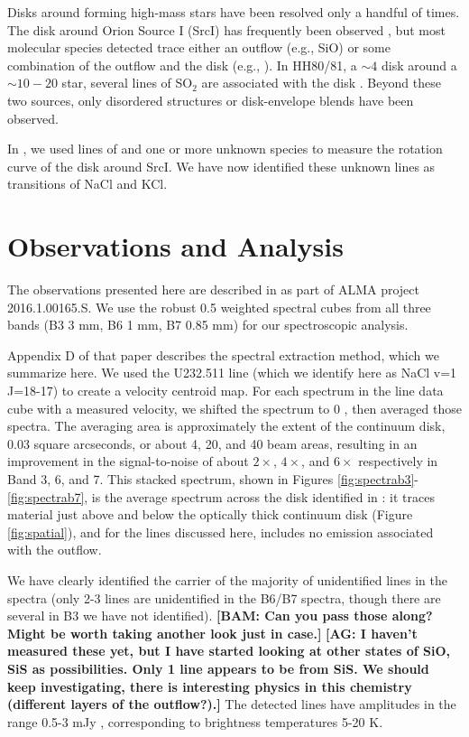 \documentclass[twocolumn]{aastex62}
\newcommand{\sourcei}{SrcI\xspace}
\newcommand{\bam}[1]{\textcolor{green!65!black}{\textbf{[BAM: #1]}}}
\newcommand{\ag}[1]{\textcolor{red!65!black}{\textbf{[AG: #1]}}}
\begin{document}
Disks around forming high-mass stars have been resolved only a handful of
times.  The disk around Orion Source I (\sourcei) has frequently been observed
\citep{Hirota2014a,Plambeck2016a,Ginsburg2018b}, but most molecular species
detected trace either an outflow (e.g., SiO) or some combination of the outflow
and the disk (e.g., \water).  In HH80/81, a $\sim4$ \msun disk around a
$\sim10-20$ \msun star, several lines of SO$_2$ are associated with the disk
\citep{Girart2017a}.  Beyond these two sources, only disordered structures or
disk-envelope blends have been observed.

In \citet[][the brine paper]{Ginsburg2018b}, we used lines of \water and one or
more unknown species to measure the rotation curve of the disk around \sourcei.
We have now identified these unknown lines as transitions of NaCl and KCl.

\section{Observations and Analysis}
The observations presented here are described in \citet{Ginsburg2018b} as part
of ALMA project 2016.1.00165.S.  We use the robust 0.5 weighted spectral cubes
from all three bands (B3 3 mm, B6 1 mm, B7 0.85 mm) for our spectroscopic analysis.

Appendix D of that paper describes the spectral extraction method,
which we summarize here.  We used the U232.511 line (which we identify here as
NaCl v=1 J=18-17) to create a velocity centroid map.  For each spectrum in the
line data cube with
a measured velocity, we shifted the spectrum to 0 \kms, then averaged those
spectra.  The averaging area is approximately the extent of the continuum
disk, 0.03 square arcseconds, or about 4, 20, and 40  beam areas, resulting
in an improvement in the signal-to-noise of about $2\times$, $4\times$, and $6\times$
respectively in Band 3, 6, and 7.
This stacked spectrum, shown in Figures \ref{fig:spectrab3}-\ref{fig:spectrab7},
is the average spectrum across the disk identified in \citet{Ginsburg2018b}:
it traces material just above and below the optically thick continuum disk
(Figure \ref{fig:spatial}), and for the lines discussed here, includes no
emission associated with the outflow.


We have clearly identified the carrier of the majority of unidentified lines in
the \citet{Ginsburg2018b} spectra (only 2-3 lines are unidentified in the B6/B7
spectra, though there are several in B3 we have not identified). \bam{Can you
pass those along?  Might be worth taking another look just in case.} \ag{I haven't measured these yet,
but I have started looking at other states of SiO, SiS as possibilities.  Only 1 line appears to be from SiS.
We should keep investigating, there is interesting physics in this chemistry (different layers of the outflow?).} The
detected lines have amplitudes in the range 0.5-3 mJy \perbeam, corresponding
to brightness temperatures 5-20 K.
\end{document}
